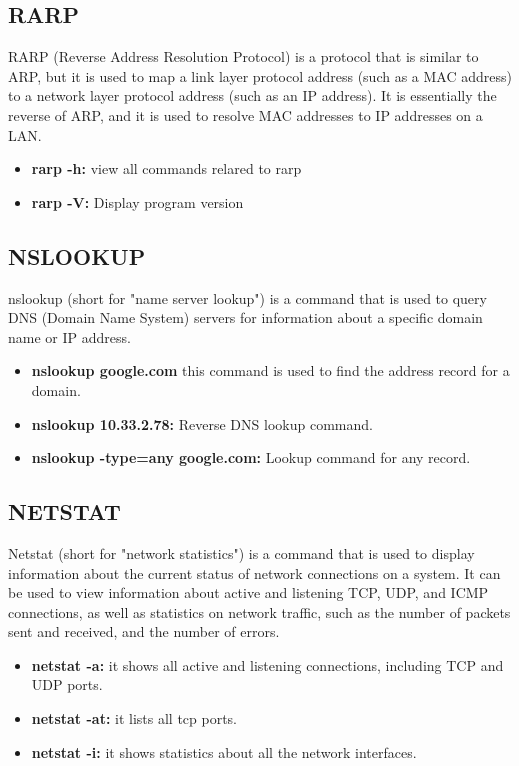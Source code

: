 \documentclass[11pt]{article}
\begin{document}
\subsection{RARP}
RARP (Reverse Address Resolution Protocol) is a protocol that is similar to ARP, but it is used to map a link layer protocol address (such as a MAC address) to a network layer protocol address (such as an IP address). It is essentially the reverse of ARP, and it is used to resolve MAC addresses to IP addresses on a LAN.
\begin{itemize}
    \item \textbf{rarp -h:} view all commands relared to rarp
    \item \textbf{rarp -V:} Display program version
\end{itemize}

\subsection{NSLOOKUP}
nslookup (short for "name server lookup") is a command that is used to query DNS (Domain Name System) servers for information about a specific domain name or IP address. 
\begin{itemize}
    \item \textbf{nslookup google.com} this command is used to find the address record for a domain.
    \item \textbf{nslookup 10.33.2.78:} Reverse DNS lookup command.
    \item \textbf{nslookup -type=any google.com:} Lookup command for any record.
\end{itemize}

\subsection{NETSTAT}
Netstat (short for "network statistics") is a command that is used to display information about the current status of network connections on a system. It can be used to view information about active and listening TCP, UDP, and ICMP connections, as well as statistics on network traffic, such as the number of packets sent and received, and the number of errors.
\begin{itemize}
    \item \textbf{netstat -a:} it shows all active and listening connections, including TCP and UDP ports.
    \item \textbf{netstat -at:} it lists all tcp ports.
    \item \textbf{netstat -i:} it shows statistics about all the network interfaces.
\end{itemize}
\end{document}
